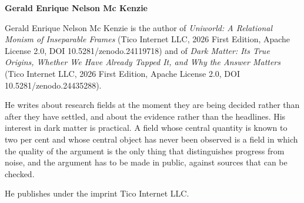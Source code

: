 \noindent\textbf{Gerald Enrique Nelson Mc Kenzie}\par
\vspace{6pt}

\noindent\small
Gerald Enrique Nelson Mc Kenzie is the author of \emph{Uniworld: A
Relational Monism of Inseparable Frames} (Tico Internet LLC, 2026 First
Edition, Apache License 2.0, DOI 10.5281/zenodo.24119718) and of
\emph{Dark Matter: Its True Origins, Whether We Have Already Tapped It, and
Why the Answer Matters} (Tico Internet LLC, 2026 First Edition, Apache
License 2.0, DOI 10.5281/zenodo.24435288).

He writes about research fields at the moment they are being decided rather
than after they have settled, and about the evidence rather than the
headlines. His interest in dark matter is practical. A field whose central
quantity is known to two per cent and whose central object has never been
observed is a field in which the quality of the argument is the only thing
that distinguishes progress from noise, and the argument has to be made in
public, against sources that can be checked.

He publishes under the imprint Tico Internet LLC.

\vfill
\noindent{\sffamily\small\color{txtdim}\rule{\textwidth}{0.4pt}}\par
{}

